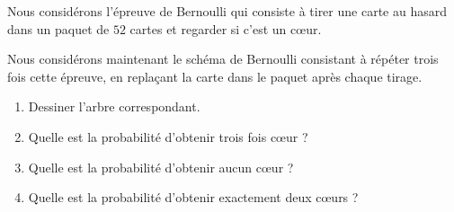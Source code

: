 
\begin{exercice}\label{exoPremiere-0074}

    Nous considérons l'épreuve de Bernoulli qui consiste à tirer une carte au hasard dans un paquet de \( 52\) cartes et regarder si c'est un cœur.

    Nous considérons maintenant le schéma de Bernoulli consistant à répéter trois fois cette épreuve, en replaçant la carte dans le paquet après chaque tirage.
    \begin{enumerate}
        \item
            Dessiner l'arbre correspondant.
\item
    Quelle est la probabilité d'obtenir trois fois cœur ?
\item
    Quelle est la probabilité d'obtenir aucun cœur ?
\item
    Quelle est la probabilité d'obtenir exactement deux cœurs ?
            
    \end{enumerate}

\end{exercice}
